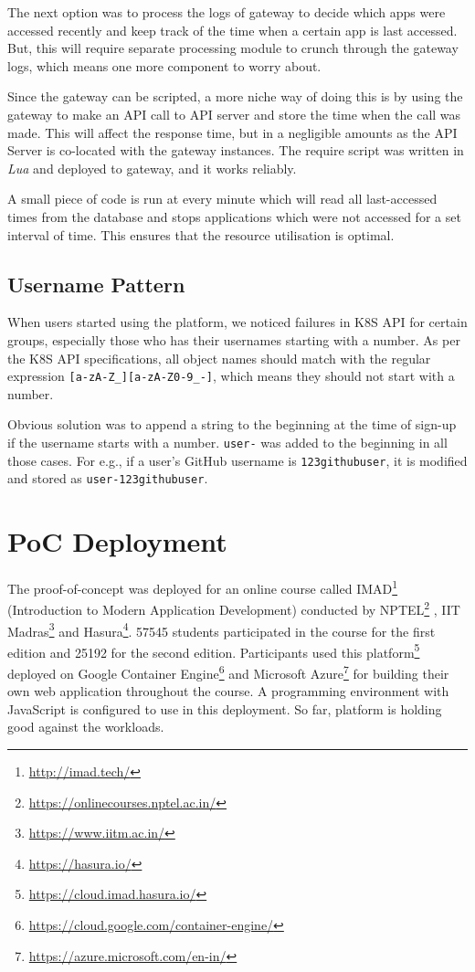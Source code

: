 \documentclass[DD]{iitmdiss}
\begin{document}
The next option was to process the logs of gateway to decide which apps were accessed recently and keep track of the time when a certain app is last accessed. But, this will require separate processing module to crunch through the gateway logs, which means one more component to worry about.

Since the gateway can be scripted, a more niche way of doing this is by using the gateway to make an API call to API server and store the time when the call was made. This will affect the response time, but in a negligible amounts as the API Server is co-located with the gateway instances.  The require script was written in \textit{Lua} and deployed to gateway, and it works reliably.

A small piece of code is run at every minute which will read all last-accessed times from the database and stops applications which were not accessed for a set interval of time. This ensures that the resource utilisation is optimal.

\subsection{Username Pattern}
When users started using the platform, we noticed failures in K8S API for certain groups, especially those who has their usernames starting with a number. As per the K8S API specifications, all object names should match with the regular expression \verb|[a-zA-Z_][a-zA-Z0-9_-]|, which means they should not start with a number. 

Obvious solution was to append a string to the beginning at the time of sign-up if the username starts with a number. \verb|user-| was added to the beginning in all those cases. For e.g., if a user's GitHub username is \verb|123githubuser|, it is modified and stored as \verb|user-123githubuser|.

\section{PoC Deployment}
The proof-of-concept was deployed for an online course called IMAD\footnote{\url{http://imad.tech/}} (Introduction to Modern Application Development) conducted by NPTEL\footnote{\url{https://onlinecourses.nptel.ac.in/}} , IIT Madras\footnote{\url{https://www.iitm.ac.in/}} and Hasura\footnote{\url{https://hasura.io/}}. 57545 students participated in the course for the first edition and 25192 for the second edition. Participants used this platform\footnote{\url{https://cloud.imad.hasura.io/}} deployed on Google Container Engine\footnote{\url{https://cloud.google.com/container-engine/}} and Microsoft Azure\footnote{\url{https://azure.microsoft.com/en-in/}} for building their own web application throughout the course. A programming environment with JavaScript is configured to use in this deployment. So far, platform is holding good against the workloads.
\end{document}
